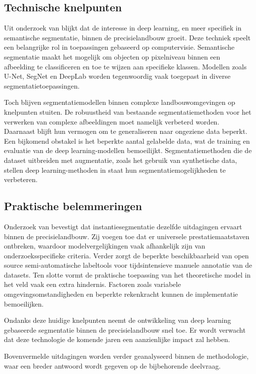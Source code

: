 \subsection{Technische knelpunten}
Uit onderzoek van \textcite{Luo2024} blijkt dat de interesse in deep learning, en meer specifiek in semantische segmentatie, binnen de precisielandbouw groeit. Deze techniek speelt een belangrijke rol in toepassingen gebaseerd op computervisie. Semantische segmentatie maakt het mogelijk om objecten op pixelniveau binnen een afbeelding te classificeren en toe te wijzen aan specifieke klassen. Modellen zoals U-Net, SegNet en DeepLab worden tegenwoordig vaak toegepast in diverse segmentatietoepassingen. 

Toch blijven segmentatiemodellen binnen complexe landbouwomgevingen op knelpunten stuiten. De robuustheid van bestaande segmentatiemethoden voor het verwerken van complexe afbeeldingen moet namelijk verbeterd worden. Daarnaast blijft hun vermogen om te generaliseren naar ongeziene data beperkt. Een bijkomend obstakel is het beperkte aantal gelabelde data, wat de training en evaluatie van de deep learning-modellen bemoeilijkt. Segmentatiemethoden die de dataset uitbreiden met augmentatie, zoals het gebruik van synthetische data, stellen deep learning-methoden in staat hun segmentatiemogelijkheden te verbeteren.

\subsection{Praktische belemmeringen}
Onderzoek van \textcite{Charisis2024} bevestigt dat instantiesegmentatie dezelfde uitdagingen ervaart binnen de precisielandbouw. Zij voegen toe dat er universele prestatiemaatstaven ontbreken, waardoor modelvergelijkingen vaak afhankelijk zijn van onderzoeksspecifieke criteria. Verder zorgt de beperkte beschikbaarheid van open source semi-automatische labeltools voor tijdsintensieve manuele annotatie van de datasets. Ten slotte vormt de praktische toepassing van het theoretische model in het veld vaak een extra hindernis. Factoren zoals variabele omgevingsomstandigheden en beperkte rekenkracht kunnen de implementatie bemoeilijken.

Ondanks deze huidige knelpunten neemt de ontwikkeling van deep learning gebaseerde segmentatie binnen de precisielandbouw snel toe. Er wordt verwacht dat deze technologie de komende jaren een aanzienlijke impact zal hebben. 

Bovenvermelde uitdagingen worden verder geanalyseerd binnen de methodologie, waar een breder antwoord wordt gegeven op de bijbehorende deelvraag.

